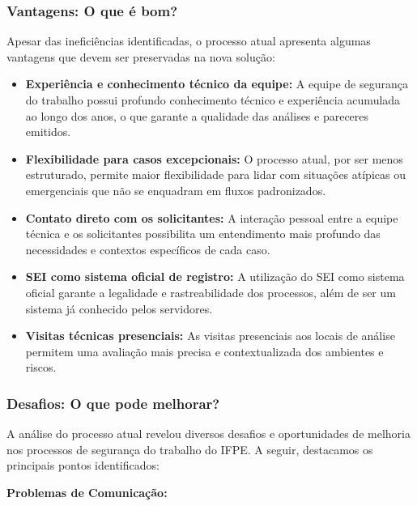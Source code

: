 \documentclass[12pt,a4paper]{article}
\begin{document}
\subsubsection{Vantagens: O que é bom?}
Apesar das ineficiências identificadas, o processo atual apresenta algumas vantagens que devem ser preservadas na nova solução:

\begin{itemize}
    \item \textbf{Experiência e conhecimento técnico da equipe:} A equipe de segurança do trabalho possui profundo conhecimento técnico e experiência acumulada ao longo dos anos, o que garante a qualidade das análises e pareceres emitidos.
    
    \item \textbf{Flexibilidade para casos excepcionais:} O processo atual, por ser menos estruturado, permite maior flexibilidade para lidar com situações atípicas ou emergenciais que não se enquadram em fluxos padronizados.
    
    \item \textbf{Contato direto com os solicitantes:} A interação pessoal entre a equipe técnica e os solicitantes possibilita um entendimento mais profundo das necessidades e contextos específicos de cada caso.
    
    \item \textbf{SEI como sistema oficial de registro:} A utilização do SEI como sistema oficial garante a legalidade e rastreabilidade dos processos, além de ser um sistema já conhecido pelos servidores.
    
    \item \textbf{Visitas técnicas presenciais:} As visitas presenciais aos locais de análise permitem uma avaliação mais precisa e contextualizada dos ambientes e riscos.
\end{itemize}

\subsubsection{Desafios: O que pode melhorar?}
A análise do processo atual revelou diversos desafios e oportunidades de melhoria nos processos de segurança do trabalho do IFPE. A seguir, destacamos os principais pontos identificados:

\textbf{Problemas de Comunicação:}
\end{document}
